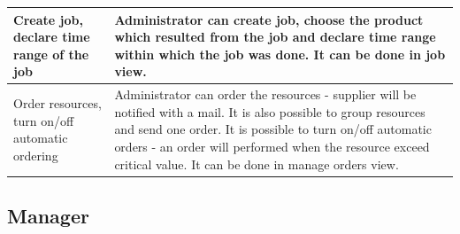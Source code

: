 \documentclass[a4paper,11pt,twoside]{report}
\theoremstyle{definition}
\begin{document}
\begin{longtable}{|p{4cm}|p{12cm}|}
Create job, declare time range of the job & Administrator can create job, choose the product which resulted from the job and declare time range within which the job was done. It can be done in job view. \\ \hline
Order resources, turn on/off automatic ordering & Administrator can order the resources - supplier will be notified with a mail. It is also possible to group resources and send one order. It is possible to turn on/off automatic orders - an order will performed when the resource exceed critical value. It can be done in manage orders view. \\ \hline


\end{longtable}

\subsection{Manager}
\end{document}
